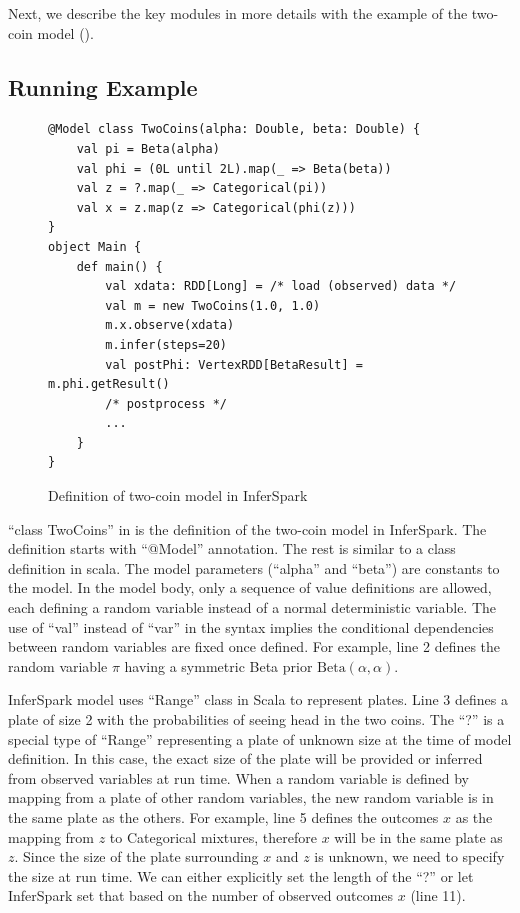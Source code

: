 Next, we describe the key modules in more details with the example of the
two-coin model (). 

\subsection{Running Example}

\begin{figure}[h]
\begin{lstlisting}
@Model class TwoCoins(alpha: Double, beta: Double) {
	val pi = Beta(alpha)
	val phi = (0L until 2L).map(_ => Beta(beta))
	val z = ?.map(_ => Categorical(pi))
	val x = z.map(z => Categorical(phi(z)))
}
object Main {
	def main() {
		val xdata: RDD[Long] = /* load (observed) data */
		val m = new TwoCoins(1.0, 1.0)
		m.x.observe(xdata)
		m.infer(steps=20)
		val postPhi: VertexRDD[BetaResult] = m.phi.getResult()
		/* postprocess */
		...
	}
}
\end{lstlisting}
\vspace*{-10pt}
\caption{Definition of two-coin model in InferSpark}
\label{fig:two_coins_modeldef}
\end{figure}

``class TwoCoins'' in  is the definition of the two-coin model
in InferSpark. The definition starts with ``{\sf @Model}'' annotation. 
The rest is similar to a class definition in
scala. The model parameters (``{\sf alpha}'' and ``{\sf beta}'') are constants to the
model. In the model body, only a sequence of value definitions are allowed,
each defining a random variable instead of a normal deterministic variable. 
The use of ``{\sf val}'' instead of ``{\sf var}'' in the syntax 
implies the conditional dependencies between random variables are fixed 
once defined. For example, line
2 defines the random variable $\pi$ having a symmetric Beta prior
$\mathrm{Beta}(\alpha, \alpha)$.

InferSpark model uses ``Range'' class in Scala to represent plates. Line 3
defines a plate of size 2 with the probabilities of seeing head in the 
two coins. The ``?'' is a special type of ``Range'' representing 
a plate of unknown size at the time of model definition. 
In this case, the exact size of the plate will be provided or inferred
from observed variables at run time.  When a random variable is
defined by mapping from a plate of other random variables, 
the new random variable is in the same plate as the others.  
For example, line 5 defines the outcomes $x$ as the mapping from $z$ 
to Categorical mixtures, therefore $x$ will be in the same plate as
$z$. Since the size of the plate surrounding $x$ and $z$ is unknown, we need
to specify the size at run time.  We can either explicitly set the length of
the ``?'' or let InferSpark set that based on the number of observed outcomes
$x$ (line 11).

